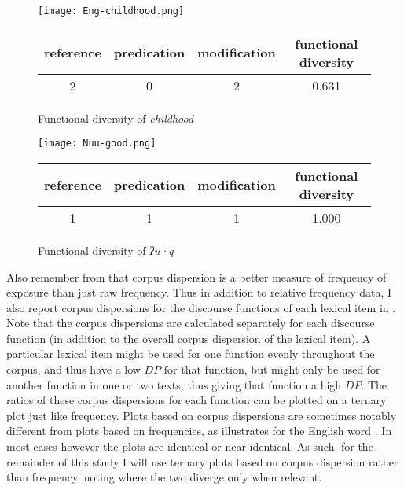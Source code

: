 \begin{figure}

  \centering
  \caption{Functional diversity of  \textit{childhood}}
  \label{fig:Eng-childhood}

  \texttt{[image: Eng-childhood.png]}

  \begin{tabular}{ c c c c }
    \toprule
    reference & predication & modification & functional diversity\\
    \midrule
    2         & 0           & 2            & 0.631\\
    \bottomrule
  \end{tabular}

\end{figure}

\begin{figure}

  \centering
  \caption{Functional diversity of  \textit{ʔu·q} }
  \label{fig:Nuu-good}

  \texttt{[image: Nuu-good.png]}

  \begin{tabular}{ c c c c }
    \toprule
    reference & predication & modification & functional diversity\\
    \midrule
    1         & 1           & 1            & 1.000\\
    \bottomrule
  \end{tabular}

\end{figure}

Also remember from  that corpus dispersion is a better measure of frequency of exposure than just raw frequency. Thus in addition to relative frequency data, I also report corpus dispersions for the discourse functions of each lexical item in . Note that the corpus dispersions are calculated separately for each discourse function (in addition to the overall corpus dispersion of the lexical item). A particular lexical item might be used for one function evenly throughout the corpus, and thus have a low $DP$ for that function, but might only be used for another function in one or two texts, thus giving that function a high $DP$. The ratios of these corpus dispersions for each function can be plotted on a ternary plot just like frequency. Plots based on corpus dispersions are sometimes notably different from plots based on frequencies, as  illustrates for the English word . In most cases however the plots are identical or near-identical. As such, for the remainder of this study I will use ternary plots based on corpus dispersion rather than frequency, noting where the two diverge only when relevant.

